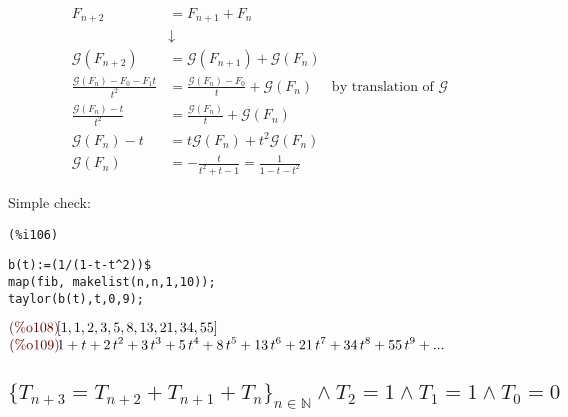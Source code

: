\begin{displaymath}
  \begin{split}
    F_{n+2} &= F_{n+1} + F_{n}  \\
    &\downarrow \\
    \mathcal{G} (F_{n+2}) &= \mathcal{G} (F_{n+1}) + \mathcal{G}
    (F_{n}) \\
    \frac{\mathcal{G} (F_n) - F_0 - F_1 t}{t^2} &= \frac{\mathcal{G}
      (F_n) - F_0}{t} + \mathcal{G}
    (F_{n}) \quad \text{ by translation of } \mathcal{G} \\
    \frac{\mathcal{G} (F_n) - t}{t^2} &= \frac{\mathcal{G} (F_n) }{t}
    + \mathcal{G}
    (F_{n}) \\
    \mathcal{G} (F_n) - t &= t \mathcal{G} (F_n) + t^2 \mathcal{G}
    (F_n)\\
    \mathcal{G} (F_n) &= - \frac{t}{t^2 + t - 1} = \frac{1}{1-t-t^2}
  \end{split}
\end{displaymath}

Simple check:

\noindent
\begin{minipage}[t]{8ex}{\color{red}\bf
\begin{verbatim}
(%i106) 
\end{verbatim}}
\end{minipage}
\begin{minipage}[t]{\textwidth}{\color{blue}
\begin{verbatim}
b(t):=(1/(1-t-t^2))$
map(fib, makelist(n,n,1,10));
taylor(b(t),t,0,9);
\end{verbatim}}
\end{minipage}
\begin{math}\displaystyle
\parbox{8ex}{\color{labelcolor}(\%o108) }
[1,1,2,3,5,8,13,21,34,55]
\end{math}\\
\begin{math}\displaystyle
\parbox{8ex}{\color{labelcolor}(\%o109) }
1+t+2\,{t}^{2}+3\,{t}^{3}+5\,{t}^{4}+8\,{t}^{5}+13\,{t}^{6}+21\,{t}^{7}+34\,{t}^{8}+55\,{t}^{9}+...
\end{math}

\subsection{$\{T_{n+3} = T_{n+2} + T_{n+1} + T_{n} \}_{n\in
    \mathbb{N}} \wedge T_2 = 1 \wedge T_1 = 1 \wedge T_0 = 0 $}

